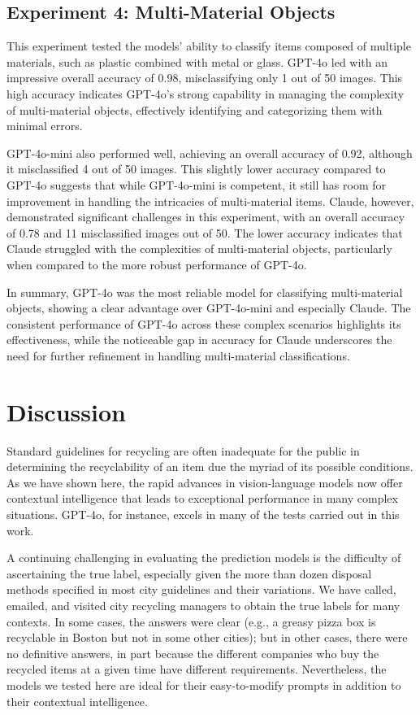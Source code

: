 \documentclass{article}
\begin{document}
\subsection{Experiment 4: Multi-Material Objects}
This experiment tested the models’ ability to classify items composed of multiple materials, such as plastic combined with metal or glass. GPT-4o led with an impressive overall accuracy of 0.98, misclassifying only 1 out of 50 images. This high accuracy indicates GPT-4o’s strong capability in managing the complexity of multi-material objects, effectively identifying and categorizing them with minimal errors.

GPT-4o-mini also performed well, achieving an overall accuracy of 0.92, although it misclassified 4 out of 50 images. This slightly lower accuracy compared to GPT-4o suggests that while GPT-4o-mini is competent, it still has room for improvement in handling the intricacies of multi-material items.
Claude, however, demonstrated significant challenges in this experiment, with an overall accuracy of 0.78 and 11 misclassified images out of 50. The lower accuracy indicates that Claude struggled with the complexities of multi-material objects, particularly when compared to the more robust performance of GPT-4o.

In summary, GPT-4o was the most reliable model for classifying multi-material objects, showing a clear advantage over GPT-4o-mini and especially Claude. The consistent performance of GPT-4o across these complex scenarios highlights its effectiveness, while the noticeable gap in accuracy for Claude underscores the need for further refinement in handling multi-material classifications.




\section{Discussion}

Standard guidelines for recycling are often inadequate for the public in determining the recyclability of an item due the myriad of its possible conditions. As we have shown here, the rapid advances in vision-language models now offer contextual intelligence that leads to exceptional performance in many complex situations. GPT-4o, for instance, excels in many of the tests carried out in this work.

A continuing challenging in evaluating the prediction models is the difficulty of ascertaining the true label, especially given the more than dozen disposal methods specified in most city guidelines and their variations. We have called, emailed, and visited city recycling managers to obtain the true labels for many contexts. In some cases, the answers were clear (e.g., a greasy pizza box is recyclable in Boston but not in some other cities); but in other cases, there were no definitive answers, in part because the different companies who buy the recycled items at a given time have different requirements. Nevertheless, the models we tested here are ideal for their easy-to-modify prompts in addition to their contextual intelligence.
\end{document}
